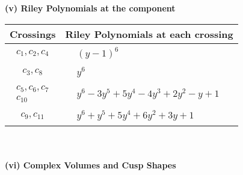 \documentclass[1p]{elsarticle_modified}
\theoremstyle{definition}
\begin{document}
\newpage\renewcommand{\arraystretch}{1}
\flushleft \textbf{(v) Riley Polynomials at the component}\newline \\
\begin{tabular}{m{50pt}|m{274pt}}
Crossings & \hspace{64pt}Riley Polynomials at each crossing \\
\hline $$\begin{aligned}c_{1},c_{2},c_{4}\end{aligned}$$&$\begin{aligned}
&(y-1)^6
\end{aligned}$\\
\hline $$\begin{aligned}c_{3},c_{8}\end{aligned}$$&$\begin{aligned}
&y^6
\end{aligned}$\\
\hline $$\begin{aligned}c_{5},c_{6},c_{7}\\c_{10}\end{aligned}$$&$\begin{aligned}
&y^6-3 y^5+5 y^4-4 y^3+2 y^2- y+1
\end{aligned}$\\
\hline $$\begin{aligned}c_{9},c_{11}\end{aligned}$$&$\begin{aligned}
&y^6+y^5+5 y^4+6 y^2+3 y+1
\end{aligned}$\\
\hline
\end{tabular}\\~\\
\newpage\flushleft \textbf{(vi) Complex Volumes and Cusp Shapes}
\end{document}
